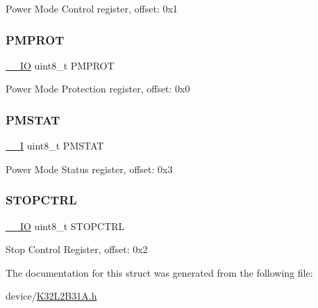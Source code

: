 Power Mode Control register, offset\+: 0x1 \mbox{\label{struct_s_m_c___type_ab80b0e0bb4c1aa3e20de93cee5828603}} 
\subsubsection{\texorpdfstring{PMPROT}{PMPROT}}
{\footnotesize\ttfamily \mbox{\hyperlink{core__cm0plus_8h_aec43007d9998a0a0e01faede4133d6be}{\+\_\+\+\_\+\+IO}} uint8\+\_\+t P\+M\+P\+R\+OT}

Power Mode Protection register, offset\+: 0x0 \mbox{\label{struct_s_m_c___type_ad38d8d9691e23bb395d7b9030040693a}} 
\subsubsection{\texorpdfstring{PMSTAT}{PMSTAT}}
{\footnotesize\ttfamily \mbox{\hyperlink{core__cm0plus_8h_af63697ed9952cc71e1225efe205f6cd3}{\+\_\+\+\_\+I}} uint8\+\_\+t P\+M\+S\+T\+AT}

Power Mode Status register, offset\+: 0x3 \mbox{\label{struct_s_m_c___type_a758faafc20c20806df9267730ac4bd6a}} 
\subsubsection{\texorpdfstring{STOPCTRL}{STOPCTRL}}
{\footnotesize\ttfamily \mbox{\hyperlink{core__cm0plus_8h_aec43007d9998a0a0e01faede4133d6be}{\+\_\+\+\_\+\+IO}} uint8\+\_\+t S\+T\+O\+P\+C\+T\+RL}

Stop Control Register, offset\+: 0x2 

The documentation for this struct was generated from the following file\+:\begin{DoxyCompactItemize}
\item 
device/\mbox{\hyperlink{_k32_l2_b31_a_8h}{K32\+L2\+B31\+A.\+h}}\end{DoxyCompactItemize}
